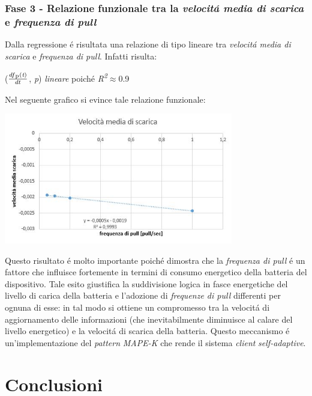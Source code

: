 \documentclass{article}
\begin{document}
\subsubsection{Fase 3 - Relazione funzionale tra la \textit{velocit\'a media di scarica} e \textit{frequenza di pull}}
Dalla regressione \'e risultata una relazione di tipo lineare tra \textit{velocit\'a media di scarica} e \textit{frequenza di pull}. Infatti risulta: 

\begin{center}
\item{(\(\frac{df\textsubscript{p}(\textit{t})}{dt}\), \textit{p})  \textit{lineare} poich\'e \textit{R\textsuperscript{2}}\(\approx\)0.9} 
\end{center}

Nel seguente grafico si evince tale relazione funzionale:

\begin{center}
\includegraphics[width=0.75\textwidth]{veloc.jpg} %
\label{fig:Relazione funzionale}
\end{center}

Questo risultato \'e molto importante poich\'e dimostra che la \textit{frequenza di pull} \'e un fattore che influisce fortemente in termini di consumo energetico della batteria del dispositivo. Tale esito giustifica la suddivisione logica in fasce energetiche del livello di carica della batteria e l'adozione di \textit{frequenze di pull} differenti per ognuna di esse: in tal modo si ottiene un compromesso tra la velocit\'a di aggiornamento delle informazioni (che inevitabilmente diminuisce al calare del livello energetico) e la velocit\'a di scarica della batteria. Questo meccanismo \'e un'implementazione del \textit{pattern} \textit{MAPE-K} che rende il sistema \textit{client} \textit{self-adaptive}.

\newpage
\section{Conclusioni}
\end{document}
